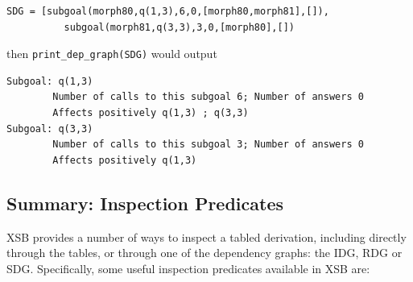 \begin{description}
\begin{example}
\begin{verbatim}
SDG = [subgoal(morph80,q(1,3),6,0,[morph80,morph81],[]),
          subgoal(morph81,q(3,3),3,0,[morph80],[])
\end{verbatim}

then {\tt print\_dep\_graph(SDG)} would output

\begin{verbatim}
Subgoal: q(1,3)
        Number of calls to this subgoal 6; Number of answers 0
        Affects positively q(1,3) ; q(3,3)
Subgoal: q(3,3)
        Number of calls to this subgoal 3; Number of answers 0
        Affects positively q(1,3) 
\end{verbatim}
\end{example}

\end{description}

\subsection{Summary: Inspection Predicates}

XSB provides a number of ways to inspect a tabled derivation,
including directly through the tables, or through one of the
dependency graphs: the IDG, RDG or SDG.  Specifically, some useful
inspection predicates available in XSB are:

